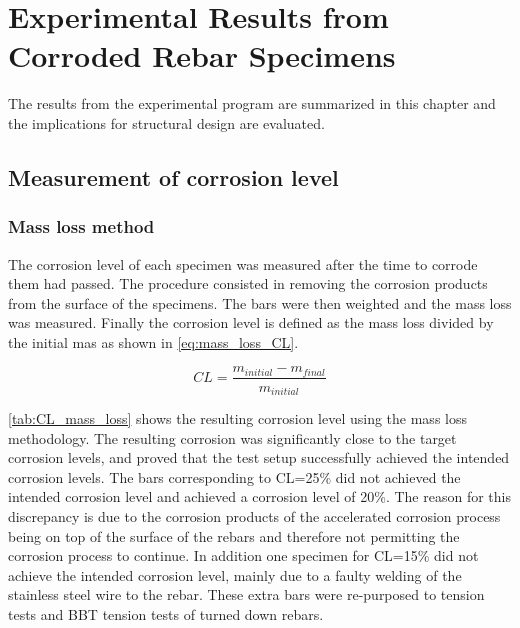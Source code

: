 \chapter{Experimental Results from Corroded Rebar Specimens}
The results from the experimental program are summarized in this chapter and the implications for structural design are evaluated.

\section{Measurement of corrosion level}

\subsection{Mass loss method}

The corrosion level of each specimen was measured after the time to corrode them had passed. The procedure consisted in removing the corrosion products from the surface of the specimens. The bars were then weighted and the mass loss was measured. Finally the corrosion level is defined as the mass loss divided by the initial mas as shown in \ref{eq:mass_loss_CL}.

\begin{equation}
    CL=\frac{m_{initial}-m_{final}}{m_{initial}}
    \label{eq:mass_loss_CL}
\end{equation}

\ref{tab:CL_mass_loss} shows the resulting corrosion level using the mass loss methodology. The resulting corrosion was significantly close to the target corrosion levels, and proved that the test setup successfully achieved the intended corrosion levels. The bars corresponding to CL=25\% did not achieved the intended corrosion level and achieved a corrosion level of 20\%. The reason for this discrepancy is due to the corrosion products of the accelerated corrosion process being on top of the surface of the rebars and therefore not permitting the corrosion process to continue. In addition one specimen for CL=15\% did not achieve the intended corrosion level, mainly due to a faulty welding of the stainless steel wire to the rebar. These extra bars were re-purposed to tension tests and BBT tension tests of turned down rebars.

